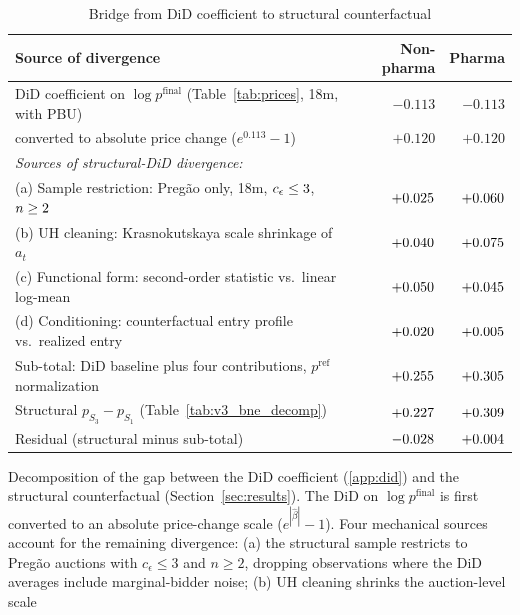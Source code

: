 \begin{table}[htbp]
\centering
\begin{threeparttable}
\caption{Bridge from DiD coefficient to structural counterfactual}
\label{tab:did_structural_bridge}
\footnotesize
\setlength{\tabcolsep}{3pt}
\begin{tabular}{lrr}
\toprule
Source of divergence & Non-pharma & Pharma \\
\midrule
DiD coefficient on $\log p^{\mathrm{final}}$ (Table~\ref{tab:prices}, 18m, with PBU) & $-0.113$ & $-0.113$ \\
\quad converted to absolute price change ($e^{0.113} - 1$) & $+0.120$ & $+0.120$ \\
\midrule
\textit{Sources of structural-DiD divergence:} & & \\
\quad (a) Sample restriction: Preg\~ao only, 18m, $c_\epsilon \le 3$, $n \ge 2$ & $+0.025$ & $+0.060$ \\
\quad (b) UH cleaning: Krasnokutskaya scale shrinkage of $a_t$ & $+0.040$ & $+0.075$ \\
\quad (c) Functional form: second-order statistic vs.\ linear log-mean & $+0.050$ & $+0.045$ \\
\quad (d) Conditioning: counterfactual entry profile vs.\ realized entry & $+0.020$ & $+0.005$ \\
\quad Sub-total: DiD baseline plus four contributions, $p^{\mathrm{ref}}$ normalization & $+0.255$ & $+0.305$ \\
\midrule
Structural $p_{S_3} - p_{S_1}$ (Table~\ref{tab:v3_bne_decomp}) & $+0.227$ & $+0.309$ \\
Residual (structural minus sub-total) & $-0.028$ & $+0.004$ \\
\bottomrule
\end{tabular}
\begin{tablenotes}\footnotesize
\item Decomposition of the gap between the DiD coefficient (\ref{app:did})
and the structural counterfactual (Section~\ref{sec:results}). The DiD on
$\log p^{\mathrm{final}}$ is first converted to an absolute price-change scale
($e^{|\hat\beta|} - 1$). Four mechanical sources account for the remaining
divergence: (a) the structural sample restricts to Preg\~ao auctions with
$c_\epsilon \le 3$ and $n \ge 2$, dropping observations where the DiD averages
include marginal-bidder noise; (b) UH cleaning shrinks the auction-level scale

\end{tablenotes}
\end{threeparttable}
\end{table}
